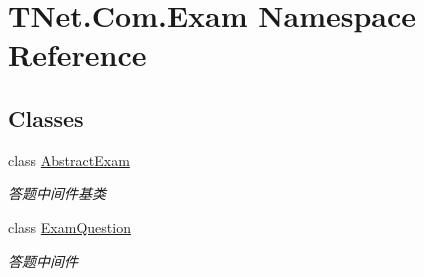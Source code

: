 \hypertarget{namespace_t_net_1_1_com_1_1_exam}{}\section{T\+Net.\+Com.\+Exam Namespace Reference}
\label{namespace_t_net_1_1_com_1_1_exam}
\subsection*{Classes}
\begin{DoxyCompactItemize}
\item 
class \mbox{\hyperlink{class_t_net_1_1_com_1_1_exam_1_1_abstract_exam}{Abstract\+Exam}}
\begin{DoxyCompactList}\small\item\em 答题中间件基类 \end{DoxyCompactList}\item 
class \mbox{\hyperlink{class_t_net_1_1_com_1_1_exam_1_1_exam_question}{Exam\+Question}}
\begin{DoxyCompactList}\small\item\em 答题中间件 \end{DoxyCompactList}\end{DoxyCompactItemize}
